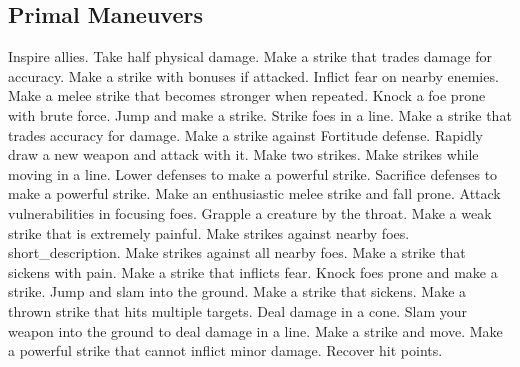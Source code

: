 \small
\subsection{Primal Maneuvers}\label{Primal Maneuvers}
\begin{spelllist}
 Inspire allies.
 Take half physical damage.
 Make a strike that trades damage for accuracy.
 Make a strike with bonuses if attacked.
 Inflict fear on nearby enemies.
 Make a melee strike that becomes stronger when repeated.
 Knock a foe prone with brute force.
 Jump and make a strike.
 Strike foes in a line.
 Make a strike that trades accuracy for damage.
 Make a strike against Fortitude defense.
 Rapidly draw a new weapon and attack with it.
 Make two strikes.
 Make strikes while moving in a line.
 Lower defenses to make a powerful strike.
 Sacrifice defenses to make a powerful strike.
 Make an enthusiastic melee strike and fall prone.
 Attack vulnerabilities in focusing foes.
 Grapple a creature by the throat.
 Make a weak strike that is extremely painful.
 Make strikes against nearby foes.
 short_description.
 Make strikes against all nearby foes.
 Make a strike that sickens with pain.
 Make a strike that inflicts fear.
 Knock foes prone and make a strike.
 Jump and slam into the ground.
 Make a strike that sickens.
 Make a thrown strike that hits multiple targets.
 Deal damage in a cone.
 Slam your weapon into the ground to deal damage in a line.
 Make a strike and move.
 Make a powerful strike that cannot inflict minor damage.
 Recover hit points.
\end{spelllist}



